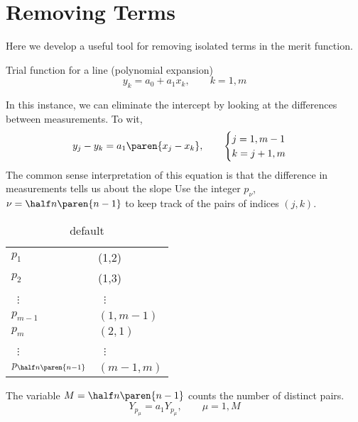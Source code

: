 \section{Removing Terms}  %
Here we develop a useful tool for removing isolated terms in the merit function.

Trial function for a line (polynomial expansion)
  \begin{equation*}   %
      y_{k} = a_{0} + a_{1} x_{k}, \qquad k = 1, m
  \end{equation*}

In this instance, we can eliminate the intercept by looking at the differences between measurements. To wit,
  \begin{equation*}   %
      y_{j} - y_{k} = a_{1} \paren{x_{j} - x_{k}}, \qquad \begin{cases}j=1, m-1\\ k= j+1, m\end{cases}
   \label{eq:difference jk}
  \end{equation*}
The common sense interpretation of this equation is that the difference in measurements tells us about the slope
Use the integer $p_{\nu}$, $\nu=\half n\paren{n-1}$ to keep track of the pairs of indices $(j,k)$. 
\begin{table}[htbp]
    \caption{default}
    \begin{center}
        \begin{tabular}{ll}
			$p_{1}$ & (1,2) \\
			$p_{2}$ & (1,3) \\
			\ $\vdots$ & \ $\vdots$ \\
			$p_{m-1}$ & $(1,m-1)$  \\
			$p_{m}$ & $(2,1)$  \\
			\ $\vdots$ & \ $\vdots$ \\
			$p_{\half n\paren{n-1}}$ & $(m-1,m)$  \\
        \end{tabular}
    \end{center}
    \label{default}
\end{table}
The variable $M  = \half n\paren{n-1}$ counts the number of distinct pairs.
  \begin{equation*}   %
      Y_{p_{\mu}} = a_{1} Y_{p_{\mu}}, \qquad \mu = 1, M
   \label{eq:difference jk}
  \end{equation*}
